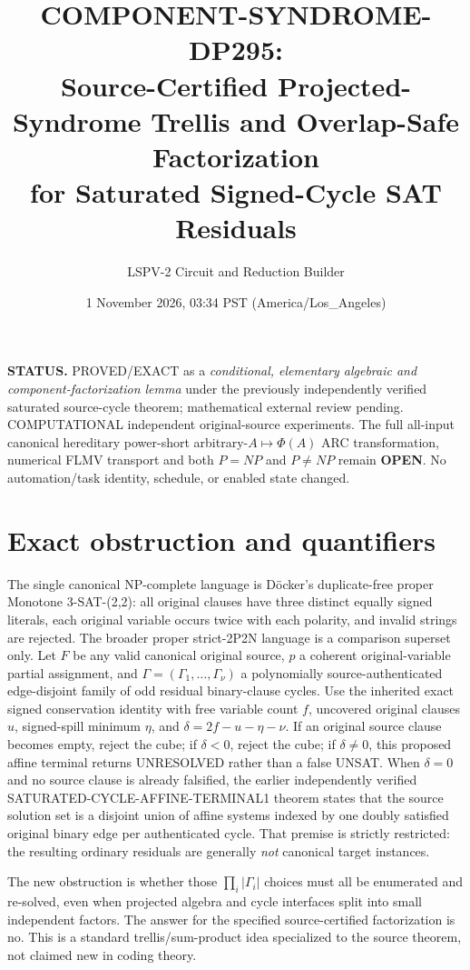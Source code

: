 \documentclass[11pt]{article}
\title{COMPONENT-SYNDROME-DP295:\\Source-Certified Projected-Syndrome Trellis and Overlap-Safe Factorization\\for Saturated Signed-Cycle SAT Residuals}
\author{LSPV-2 Circuit and Reduction Builder}
\date{1 November 2026, 03:34 PST (America/Los\_Angeles)}
\begin{document}
\maketitle
\noindent\textbf{STATUS.} PROVED/EXACT as a \emph{conditional, elementary algebraic and component-factorization lemma} under the previously independently verified saturated source-cycle theorem; mathematical external review pending. COMPUTATIONAL independent original-source experiments. The full all-input canonical hereditary power-short arbitrary-$A\mapsto\Phi(A)$ ARC transformation, numerical FLMV transport and both $P=NP$ and $P\ne NP$ remain \textbf{OPEN}. No automation/task identity, schedule, or enabled state changed.

\section{Exact obstruction and quantifiers}
The single canonical NP-complete language is D\"ocker's duplicate-free proper Monotone 3-SAT-(2,2): all original clauses have three distinct equally signed literals, each original variable occurs twice with each polarity, and invalid strings are rejected. The broader proper strict-2P2N language is a comparison superset only. Let $F$ be any valid canonical original source, $p$ a coherent original-variable partial assignment, and $\Gamma=(\Gamma_1,\ldots,\Gamma_\nu)$ a polynomially source-authenticated edge-disjoint family of odd residual binary-clause cycles. Use the inherited exact signed conservation identity with free variable count $f$, uncovered original clauses $u$, signed-spill minimum $\eta$, and $\delta=2f-u-\eta-\nu$. If an original source clause becomes empty, reject the cube; if $\delta<0$, reject the cube; if $\delta\ne0$, this proposed affine terminal returns UNRESOLVED rather than a false UNSAT. When $\delta=0$ and no source clause is already falsified, the earlier independently verified SATURATED-CYCLE-AFFINE-TERMINAL1 theorem states that the source solution set is a disjoint union of affine systems indexed by one doubly satisfied original binary edge per authenticated cycle. That premise is strictly restricted: the resulting ordinary residuals are generally \emph{not} canonical target instances.

The new obstruction is whether those $\prod_i|\Gamma_i|$ choices must all be enumerated and re-solved, even when projected algebra and cycle interfaces split into small independent factors. The answer for the specified source-certified factorization is no. This is a standard trellis/sum-product idea specialized to the source theorem, not claimed new in coding theory.
\end{document}
